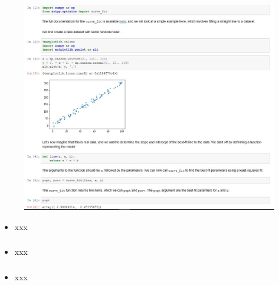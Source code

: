 \documentclass[english,14pt]{beamer}
\begin{document}

\begin{frame}[fragile]

\frametitle{}

\begin{figure}[ht]
	\centering
	\includegraphics[width=\textwidth]{figures/linearfitscratch}
\end{figure}


\begin{itemize}
	\item xxx
\end{itemize}

\end{frame}



\begin{frame}[fragile]

\frametitle{}

\begin{itemize}
	\item xxx
\end{itemize}

\end{frame}


\begin{frame}[fragile]

\frametitle{}

\begin{itemize}
	\item xxx
\end{itemize}

\end{frame}
\end{document}
